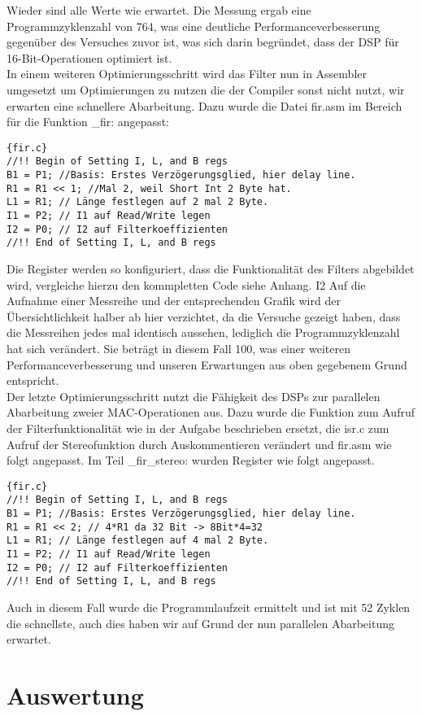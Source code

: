 Wieder sind alle Werte wie erwartet.
Die Messung ergab eine Programmzyklenzahl von 764, was eine deutliche Performanceverbesserung gegen\"uber des Versuches zuvor ist, was sich darin begr\"undet, dass der DSP f\"ur 16-Bit-Operationen optimiert ist.\\
In einem weiteren Optimierungsschritt wird das Filter nun in Assembler umgesetzt um Optimierungen zu nutzen die der Compiler sonst nicht nutzt, wir erwarten eine schnellere Abarbeitung.
Dazu wurde die Datei fir.asm im Bereich f\"ur die Funktion _fir: angepasst:
\begin{adjustbox}{width=\textwidth,height=\textheight,keepaspectratio}
 \begin{lstlisting}[title=fir.c]{fir.c}
//!! Begin of Setting I, L, and B regs	
B1 = P1; //Basis: Erstes Verzögerungsglied, hier delay line.
R1 = R1 << 1; //Mal 2, weil Short Int 2 Byte hat.
L1 = R1; // Länge festlegen auf 2 mal 2 Byte.
I1 = P2; // I1 auf Read/Write legen
I2 = P0; // I2 auf Filterkoeffizienten
//!! End of Setting I, L, and B regs

\end{lstlisting}
\end{adjustbox}
Die Register werden so konfiguriert, dass die Funktionalität des Filters abgebildet wird, vergleiche hierzu den kommpletten Code siehe Anhang. I2 
Auf die Aufnahme einer Messreihe und der entsprechenden Grafik wird der Übersichtlichkeit halber ab hier verzichtet, da die Versuche gezeigt haben, dass die Messreihen jedes mal identisch aussehen, lediglich die Programmzyklenzahl hat sich verändert. Sie beträgt in diesem Fall 100, was einer weiteren Performanceverbesserung und unseren Erwartungen aus oben gegebenem Grund entspricht.\\
Der letzte Optimierungsschritt nutzt die Fähigkeit des DSPs zur parallelen Abarbeitung zweier MAC-Operationen aus. Dazu wurde die Funktion zum Aufruf der Filterfunktionalität wie in der Aufgabe beschrieben ersetzt, die isr.c zum Aufruf der Stereofunktion durch Auskommentieren verändert und fir.asm wie folgt angepasst. Im Teil _fir_stereo: wurden Register wie folgt angepasst.

\begin{adjustbox}{width=\textwidth,height=\textheight,keepaspectratio}
 \begin{lstlisting}[title=fir.c]{fir.c}
//!! Begin of Setting I, L, and B regs	
B1 = P1; //Basis: Erstes Verzögerungsglied, hier delay line.
R1 = R1 << 2; // 4*R1 da 32 Bit -> 8Bit*4=32
L1 = R1; // Länge festlegen auf 4 mal 2 Byte.
I1 = P2; // I1 auf Read/Write legen
I2 = P0; // I2 auf Filterkoeffizienten
//!! End of Setting I, L, and B regs
\end{lstlisting}
\end{adjustbox}
Auch in diesem Fall wurde die Programmlaufzeit ermittelt und ist mit 52 Zyklen die schnellste, auch dies haben wir auf Grund der nun parallelen Abarbeitung erwartet.



\section{Auswertung}
